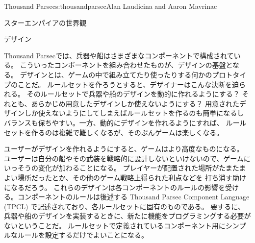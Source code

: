 \begin{aosachapter}{Thousand Parsec}{s:thousandparsec}{Alan Laudicina and Aaron Mavrinac}
\begin{aosasect1}{スターエンパイアの世界観}
\begin{aosasect2}{デザイン}

Thousand Parsecでは、兵器や船はさまざまなコンポーネントで構成されている。
こういったコンポーネントを組み合わせたものが、デザインの基盤となる。
デザインとは、ゲームの中で組み立てたり使ったりする何かのプロトタイプのことだ。
ルールセットを作ろうとすると、デザイナーはこんな決断を迫られる。
そのルールセットで兵器や船のデザインを動的に作れるようにする？
それとも、あらかじめ用意したデザインしか使えないようにする？
用意されたデザインしか使えないようにしてしまえばルールセットを作るのも簡単になるし
バランスも保ちやすい。一方、動的にデザインを作れるようにすれば、
ルールセットを作るのは複雑で難しくなるが、そのぶんゲームは楽しくなる。

ユーザーがデザインを作れるようにすると、ゲームはより高度なものになる。
ユーザーは自分の船やその武装を戦略的に設計しないといけないので、ゲームにいっそうの変化が加わることになる。
プレイヤーが配置された場所がたまたまよい場所だったとか、その他のゲーム戦略上得られた利点などを
打ち消す助けになるだろう。
これらのデザインは各コンポーネントのルールの影響を受ける。コンポーネントのルールは後述する
Thousand Parsec Component Language (TPCL)
で記述されており、各ルールセットに固有のものである。
要するに、兵器や船のデザインを実装するときに、新たに機能をプログラミングする必要がないということだ。
ルールセットで定義されているコンポーネント用にシンプルなルールを設定するだけでよいことになる。


\end{aosasect2}
\end{aosasect1}
\end{aosachapter}
